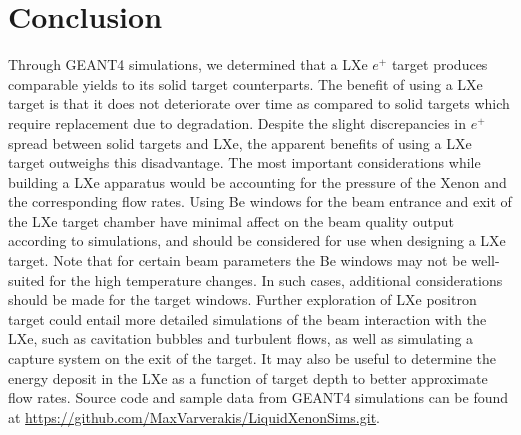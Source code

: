 \documentclass[
reprint,
nofootinbib,
amsmath, amssymb,
aps,
floatfix,
]{revtex4-2}
\begin{document}
\section{Conclusion}
Through GEANT4 simulations, we determined that a LXe $e^+$ target produces comparable yields to its solid target counterparts.
The benefit of using a LXe target is that it does not deteriorate over time as compared to solid targets which require replacement due to degradation.
Despite the slight discrepancies in $e^+$ spread between solid targets and LXe, the apparent benefits of using a LXe target outweighs this disadvantage.
The most important considerations while building a LXe apparatus would be accounting for the pressure of the Xenon and the corresponding flow rates.  Using Be windows for the beam entrance and exit of the LXe target chamber have minimal affect on the beam quality output according to simulations, and should be considered for use when designing a LXe target.
Note that for certain beam parameters the Be windows may not be well-suited for the high temperature changes.
In such cases, additional considerations should be made for the target windows.
Further exploration of LXe positron target could entail more detailed simulations of the beam interaction with the LXe,
such as cavitation bubbles and turbulent flows, as well as simulating a capture system on the exit of the target.
It may also be useful to determine the energy deposit in the LXe as a function of target depth to better approximate flow rates.
Source code and sample data from GEANT4 simulations can be found at 
\url{https://github.com/MaxVarverakis/LiquidXenonSims.git}.











\end{document}
